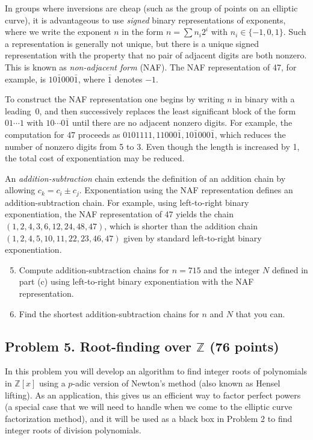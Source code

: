 \documentclass[11pt]{article}
\newcommand{\Z}{\mathbb{Z}}
\begin{document}
In groups where inversions are cheap (such as the group of points on an elliptic curve), it is advantageous to use \emph{signed} binary representations of exponents, where we write the exponent $n$ in the form $n=\sum n_i2^i$ with $n_i\in\{-1,0,1\}$.  Such a representation is generally not unique, but there is a unique signed representation with the property that no pair of adjacent digits are both nonzero.  This is known as \emph{non-adjacent form} (NAF).  The NAF representation of 47, for example, is $10\bar{1}000\bar{1}$, where $\bar{1}$ denotes $-1$.

To construct the NAF representation one begins by writing $n$ in binary with a leading~$0$, and then successively replaces the least significant block of the form $01\cdots1$ with $10\cdots0\bar{1}$ until there are no adjacent nonzero digits.  For example, the computation for $47$ proceeds as $0101111, 11000\bar{1}, 10\bar{1}000\bar{1}$, which reduces the number of nonzero digits from 5 to 3.  Even though the length is increased by 1, the total cost of exponentiation may be reduced.

An \emph{addition-subtraction} chain extends the definition of an addition chain by allowing $c_k=c_i\pm c_j$.
Exponentiation using the NAF representation defines an addition-subtraction chain.
For example, using left-to-right binary exponentiation, the NAF representation of 47 yields the chain $(1,2,4,3,6,12,24,48,47)$,
which is shorter than the addition chain $(1,2,4,5,10,11,22,23,46,47)$ given by standard left-to-right binary exponentiation.

\begin{enumerate}[{\bf (a)}]
\setcounter{enumi}{4}
\item Compute addition-subtraction chains for $n=715$ and the integer $N$ defined in part (c) using left-to-right binary exponentiation with the NAF representation.
\item Find the shortest addition-subtraction chains for $n$ and $N$ that you can.
\end{enumerate}

\subsection*{Problem 5. Root-finding over $\Z$ (76 points)}
In this problem you will develop an algorithm to find integer roots of polynomials in $\Z[x]$ using a $p$-adic version of Newton's method (also known as Hensel lifting).
As an application, this gives us an efficient way to factor perfect powers (a special case that we will need to handle when we come to the elliptic curve factorization method),
and it will be used as a black box in Problem 2 to find integer roots of division polynomials.
\end{document}
